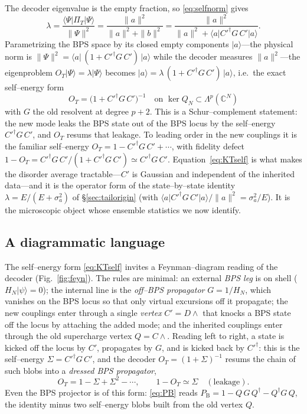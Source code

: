 \documentclass[11pt]{article}
\newcommand{\ket}[1]{\lvert #1\rangle}
\newcommand{\bra}[1]{\langle #1\rvert}
\newcommand{\PB}{P_{\mathrm B}}
\newcommand{\PiT}{\Pi_T}
\newcommand{\OT}{O_T}
\newcommand{\dg}{^{\dagger}}
\begin{document}
The decoder eigenvalue is the empty fraction, so \eqref{eq:selfnorm} gives
\[
  \lambda=\frac{\bra\Psi\PiT\ket\Psi}{\|\Psi\|^2}
  =\frac{\|a\|^2}{\|a\|^2+\|b\|^2}
  =\frac{\|a\|^2}{\|a\|^2+\bra a{C'}\dg G\,C'\ket a}.
\]
Parametrizing the BPS space by its closed empty components $\ket a$---the physical norm is
$\|\Psi\|^2=\bra a\,(1+{C'}\dg G\,C')\,\ket a$ while the decoder measures $\|a\|^2$---the eigenproblem
$\OT\ket\Psi=\lambda\ket\Psi$ becomes $\ket a=\lambda\,(1+{C'}\dg G\,C')\,\ket a$, i.e.\ the exact
self--energy form
\begin{equation}
  \boxed{\;\OT=\big(1+{C'}\dg G\,C'\big)^{-1}\quad\text{on }\ker Q_N\subset\Lambda^p(\mathbb C^N)\;}
  \label{eq:KTself}
\end{equation}
with $G$ the old resolvent at degree $p+2$. This is a Schur--complement statement: the new mode leaks
the BPS state out of the BPS locus by the self--energy ${C'}\dg G\,C'$, and $\OT$ resums that leakage.
To leading order in the new couplings it is the familiar self--energy
$\OT=1-{C'}\dg G\,C'+\cdots$, with fidelity defect
$1-\OT={C'}\dg G\,C'/(1+{C'}\dg G\,C')\simeq{C'}\dg G\,C'$. Equation~\eqref{eq:KTself} is what makes the
disorder average tractable---$C'$ is Gaussian and independent of the inherited data---and it is the
operator form of the state--by--state identity $\lambda=E/(E+\sigma_a^2)$ of \S\ref{sec:tailorigin}
(with $\bra a{C'}\dg G\,C'\ket a/\|a\|^2=\sigma_a^2/E$). It is the microscopic object whose ensemble
statistics we now identify.

\subsection{A diagrammatic language}
\label{sec:diagrams}
The self--energy form \eqref{eq:KTself} invites a Feynman--diagram reading of the decoder
(Fig.~\ref{fig:feyn}). The rules are minimal: an external \emph{BPS leg} is on shell
($H_N\ket\psi=0$); the internal line is the \emph{off--BPS propagator} $G=1/H_N$, which vanishes on
the BPS locus so that only virtual excursions off it propagate; the new couplings enter through a
single \emph{vertex} $C'=D\wedge$ that knocks a BPS state off the locus by attaching the added mode;
and the inherited couplings enter through the old supercharge vertex $Q=C\wedge$. Reading left to
right, a state is kicked off the locus by $C'$, propagates by $G$, and is kicked back by ${C'}\dg$:
this is the self--energy $\Sigma={C'}\dg G\,C'$, and the decoder $\OT=(1+\Sigma)^{-1}$ resums the chain
of such blobs into a \emph{dressed BPS propagator},
\begin{equation}
  \OT=1-\Sigma+\Sigma^2-\cdots,\qquad 1-\OT\simeq\Sigma\quad(\text{leakage}).
  \label{eq:dyson}
\end{equation}
Even the BPS projector is of this form: \eqref{eq:PB} reads $\PB=1-Q\,G\,Q\dg-Q\dg G\,Q$, the identity
minus two self--energy blobs built from the old vertex $Q$.
\end{document}
